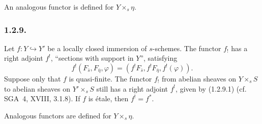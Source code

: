 An analogous functor is defined for $Y\times_s\eta$.

\subsubsection*{1.2.9.}
Let $f:Y\hookrightarrow Y'$ be a locally closed immersion of
$s$-schemes.  The functor $f_!$ has a right adjoint $f^!$, ``sections
with support in $Y$'', satisfying
\begin{equation}\tag{1.2.9.1}
f^!(F_{\bar s},F_{\bar\eta},\varphi)
=(f^!F_{\bar s},f^!F_{\bar\eta},f^!(\varphi)).
\end{equation}
Suppose only that $f$ is quasi-finite.  The functor $f_!$ from
abelian sheaves on $Y\times_sS$ to abelian sheaves on
$Y'\times_sS$ still has a right adjoint $f^!$, given by (1.2.9.1)
(cf. SGA~4, XVIII, 3.1.8).  If $f$ is \'{e}tale, then $f^!=f^*$.

Analogous functors are defined for $Y\times_s\eta$.
